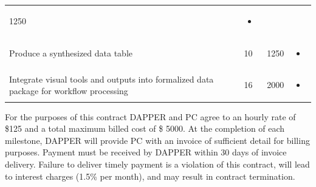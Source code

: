 \documentclass[
  11pt,
]{article}
\begin{document}
\begin{longtable}[]{@{}llll@{}}
\begin{minipage}[t]{0.15\columnwidth}
1250\strut
\end{minipage} & \begin{minipage}[t]{0.15\columnwidth}\raggedright
\begin{itemize}
\item
\end{itemize}\strut
\end{minipage}\tabularnewline
\begin{minipage}[t]{0.45\columnwidth}\raggedright
Produce a synthesized data table\strut
\end{minipage} & \begin{minipage}[t]{0.15\columnwidth}\raggedright
10\strut
\end{minipage} & \begin{minipage}[t]{0.15\columnwidth}\raggedright
1250\strut
\end{minipage} & \begin{minipage}[t]{0.15\columnwidth}\raggedright
\begin{itemize}
\item
\end{itemize}\strut
\end{minipage}\tabularnewline
\begin{minipage}[t]{0.45\columnwidth}\raggedright
Integrate visual tools and outputs into formalized data package for
workflow processing\strut
\end{minipage} & \begin{minipage}[t]{0.15\columnwidth}\raggedright
16\strut
\end{minipage} & \begin{minipage}[t]{0.15\columnwidth}\raggedright
2000\strut
\end{minipage} & \begin{minipage}[t]{0.15\columnwidth}\raggedright
\begin{itemize}
\item
\end{itemize}\strut
\end{minipage}\tabularnewline
\bottomrule
\end{longtable}

For the purposes of this contract DAPPER and PC agree to an hourly rate
of \$125 and a total maximum billed cost of \$ 5000. At the completion
of each milestone, DAPPER will provide PC with an invoice of sufficient
detail for billing purposes. Payment must be received by DAPPER within
30 days of invoice delivery. Failure to deliver timely payment is a
violation of this contract, will lead to interest charges (1.5\% per
month), and may result in contract termination.
\end{document}
